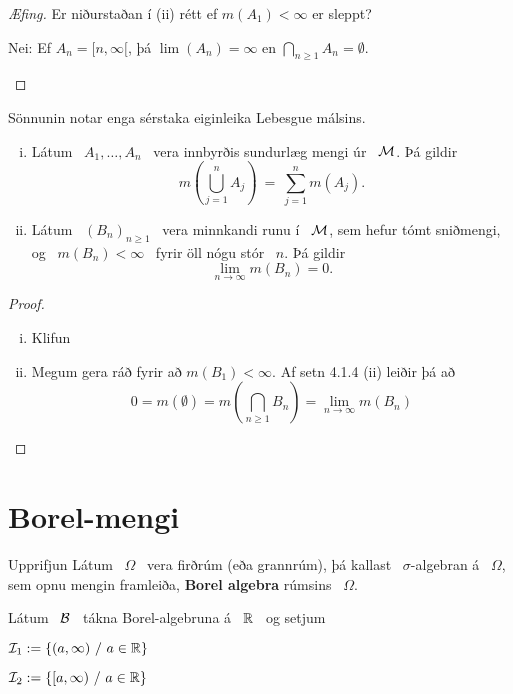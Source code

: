 \documentclass[12pt]{report}
\newcommand{\Om}{\Omega}
\newcommand{\B}{{\cal B}}
\newcommand{\I}{{\cal I}}
\newcommand{\M}{{\cal M}}
\begin{document}
\begin{proof}[Æfing]
  Er niðurstaðan í (ii) rétt ef $m(A_1) < \infty$ er sleppt?
  \begin{lausn}
    Nei: Ef $A_n = [n, \infty[$, þá $\lim (A_n) = \infty$ en
    $\bigcap_{n \geq 1} A_n = \emptyset$.
  \end{lausn}
\end{proof}

\begin{ath}
  Sönnunin notar enga sérstaka eiginleika Lebesgue málsins.
\end{ath}

\begin{setn*}
\begin{enumerate}[(i)]
\item
Látum \ $A_1,\ldots,A_n$ \ vera innbyrðis sundurlæg mengi úr \ $\M$. Þá gildir
\[
m\left(\bigcup_{j=1}^nA_j\right) \ = \ \sum_{j=1}^nm(A_j).
\]
\item
Látum \ $(B_n)_{n\geq 1}$ \ vera minnkandi runu í \ $\M$, sem hefur tómt sniðmengi, og \ $m(B_n)<\infty$ \ fyrir öll nógu stór \ $n$. Þá gildir
\[
\lim_{n\to\infty}m(B_n) = 0.
\]
\end{enumerate}
\end{setn*}

\begin{proof}
  \begin{enumerate}[(i)]
  \item Klifun
  \item Megum gera ráð fyrir að $m(B_1) < \infty$. Af setn 4.1.4 (ii)
    leiðir þá að
    \[ 0 = m(\emptyset) = m(\bigcap_{n \geq 1} B_n) = \lim_{n \to
      \infty} m(B_n) \]
  \end{enumerate}
\end{proof}

\section{Borel-mengi}

\begin{ath}{Upprifjun}
Látum \ $\Om$ \ vera firðrúm (eða grannrúm), þá kallast  \ $\sigma$-algebran á \ $\Om$,  sem opnu mengin
framleiða, {\bf Borel algebra} rúmsins \ $\Om$.
\end{ath}

Látum \ $\B$ \ tákna Borel-algebruna á \ $\mathbb{R}$ \ og setjum 

\medskip
$\I_1 := \{(a,\infty)\ /\ a\in\R\}$

\medskip
$\I_2 := \{[a,\infty)\ /\ a\in\R\}$
\end{document}
